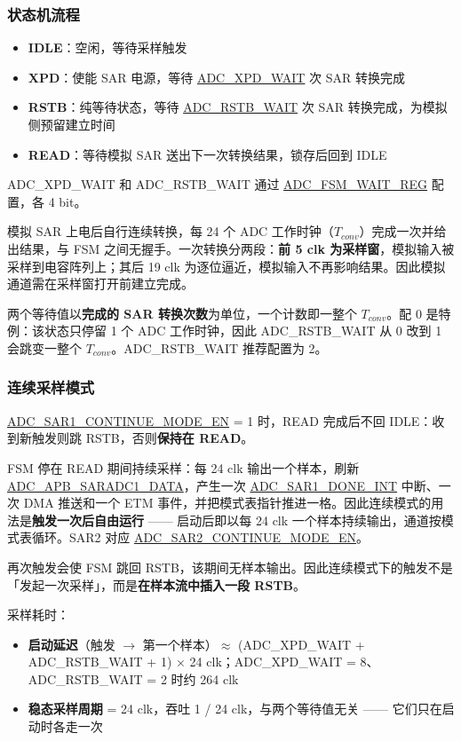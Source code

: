 \documentclass[main\_\_CN.tex]{subfiles}
\begin{document}
\subsubsection{状态机流程}
\begin{itemize}
    \item \textbf{IDLE}：空闲，等待采样触发
    \item \textbf{XPD}：使能 SAR 电源，等待 \hyperref[fielddesc:ADCXPDWAIT]{ADC\_XPD\_WAIT} 次 SAR 转换完成
    \item \textbf{RSTB}：纯等待状态，等待 \hyperref[fielddesc:ADCRSTBWAIT]{ADC\_RSTB\_WAIT} 次 SAR 转换完成，为模拟侧预留建立时间
    \item \textbf{READ}：等待模拟 SAR 送出下一次转换结果，锁存后回到 IDLE
\end{itemize}

ADC\_XPD\_WAIT 和 ADC\_RSTB\_WAIT 通过 \hyperref[regdesc:ADCFSMWAITREG]{ADC\_FSM\_WAIT\_REG} 配置，各 4 bit。

模拟 SAR 上电后自行连续转换，每 24 个 ADC 工作时钟（$T_{conv}$）完成一次并给出结果，与 FSM 之间无握手。一次转换分两段：\textbf{前 5 clk 为采样窗}，模拟输入被采样到电容阵列上；其后 19 clk 为逐位逼近，模拟输入不再影响结果。因此模拟通道需在采样窗打开前建立完成。

两个等待值以\textbf{完成的 SAR 转换次数}为单位，一个计数即一整个 $T_{conv}$。配 0 是特例：该状态只停留 1 个 ADC 工作时钟，因此 ADC\_RSTB\_WAIT 从 0 改到 1 会跳变一整个 $T_{conv}$。ADC\_RSTB\_WAIT 推荐配置为 2。

\subsubsection{连续采样模式}
\hyperref[fielddesc:ADCSAR1CONTINUEMODEEN]{ADC\_SAR1\_CONTINUE\_MODE\_EN} = 1 时，READ 完成后不回 IDLE：收到新触发则跳 RSTB，否则\textbf{保持在 READ}。

FSM 停在 READ 期间持续采样：每 24 clk 输出一个样本，刷新 \hyperref[fielddesc:ADCAPBSARADC1DATA]{ADC\_APB\_SARADC1\_DATA}，产生一次 \hyperref[interreupt:ADCSAR1DONEINT]{ADC\_SAR1\_DONE\_INT} 中断、一次 DMA 推送和一个 ETM 事件，并把模式表指针推进一格。因此连续模式的用法是\textbf{触发一次后自由运行} —— 启动后即以每 24 clk 一个样本持续输出，通道按模式表循环。SAR2 对应 \hyperref[fielddesc:ADCSAR2CONTINUEMODEEN]{ADC\_SAR2\_CONTINUE\_MODE\_EN}。

再次触发会使 FSM 跳回 RSTB，该期间无样本输出。因此连续模式下的触发不是「发起一次采样」，而是\textbf{在样本流中插入一段 RSTB}。

采样耗时：
\begin{itemize}
    \item \textbf{启动延迟}（触发 $\to$ 第一个样本）$\approx$ (ADC\_XPD\_WAIT + ADC\_RSTB\_WAIT + 1) $\times$ 24 clk；ADC\_XPD\_WAIT = 8、ADC\_RSTB\_WAIT = 2 时约 264 clk
    \item \textbf{稳态采样周期} = 24 clk，吞吐 1 / 24 clk，与两个等待值无关 —— 它们只在启动时各走一次
\end{itemize}
\end{document}
